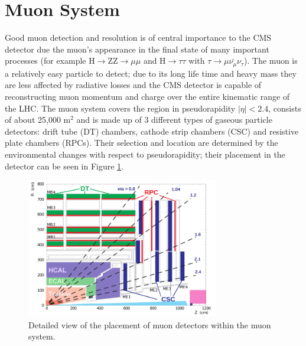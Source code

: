 \section{Muon System}
Good muon detection and resolution is of central importance 
to the CMS detector due the muon's appearance in the final state of many important processes
(for example H$\rightarrow$ZZ$\rightarrow\mu\mu$ and H$\rightarrow\tau\tau$ 
with $\tau\rightarrow\mu\bar{\nu_{\mu}}\nu_{\tau}$). 
The muon is a relatively easy particle to detect; due to its long life time 
and heavy mass they are less affected by radiative losses and the
CMS detector is capable of reconstructing muon momentum and charge over the entire
kinematic range of the LHC. The muon system covers the region in pseudorapidity
$|\eta|<2.4$, consists of about 25,000 m$^{2}$ and is made up of 3
 different types of gaseous particle detectors: drift tube (DT) chambers, 
 cathode strip chambers (CSC) and resistive plate chambers (RPCs).
 Their selection and location are determined by the environmental
 changes with respect to pseudorapidity; their placement in the detector
 can be seen in Figure \ref{fig:muonLayout}. 
 \begin{figure}[hb]
  \centering
	\includegraphics[width=0.75\textwidth]{images/muonSysLayout.png}
  	\caption[Layout of the Muon Sub-Detector]
   	{Detailed view of the placement of muon detectors within the muon system.}
	\label{fig:muonLayout}
\end{figure}
 

